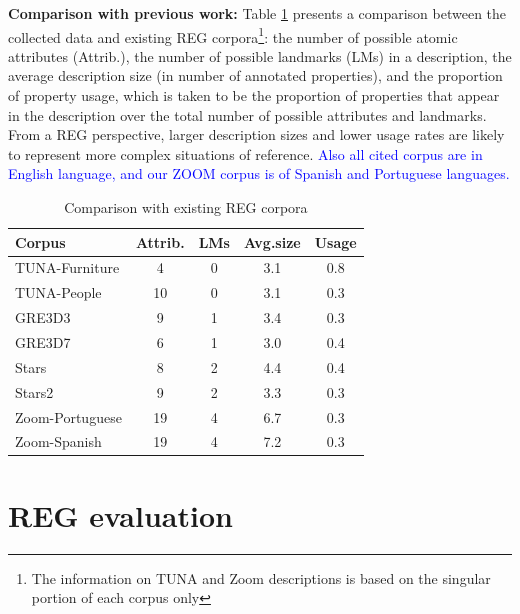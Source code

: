 \documentclass[11pt]{article}
\begin{document}
{\bf Comparison with previous work:} Table \ref{tab-comparison} presents a comparison between the collected data and existing REG corpora\footnote{The information on TUNA and Zoom descriptions is based on the singular portion of each corpus only}: the number of possible atomic attributes (Attrib.), the number of possible landmarks (LMs) in a  description, the average description size (in number of annotated properties), and the proportion of property usage, which is taken to be the proportion of properties that appear in the description over the total number of possible attributes and landmarks. From a REG perspective, larger description sizes and lower usage rates are likely to represent more complex situations of reference. \textcolor{blue}{Also all cited corpus are in English language, and our ZOOM corpus is of Spanish and Portuguese languages.}

\begin{table}[ht]
\begin{center}
\footnotesize{
\caption{Comparison with existing REG corpora}
\label{tab-comparison}
\begin{tabular} {  l c c c c}
\hline
Corpus											& Attrib.			& LMs			& Avg.size	& Usage \\
\hline
TUNA-Furniture							& 4								& 0							&	3.1				& 0.8   \\
TUNA-People									& 10							& 0							& 3.1				& 0.3   \\
GRE3D3											&	9								& 1							& 3.4				& 0.3   \\
GRE3D7											&	6								& 1							& 3.0				& 0.4   \\
Stars												&	8								& 2							& 4.4				& 0.4   \\
Stars2											& 9								& 2							& 3.3				& 0.3   \\
Zoom-Portuguese							& 19							& 4							& 6.7				& 0.3   \\
Zoom-Spanish								& 19							& 4							& 7.2				& 0.3   \\
\hline
\end{tabular}
}
\end{center}
\end{table}


\section{REG evaluation}
\label{sec-eval}
\end{document}
